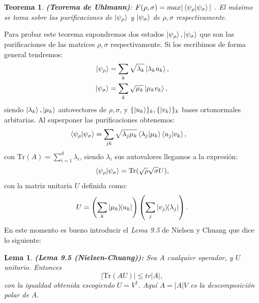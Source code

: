 \documentclass[letterpaper,12pt]{thesisECFM}
\theoremstyle{plain}
\newtheorem{thm}{Teorema}[section]
\newtheorem{lem}{Lema}[chapter]
\theoremstyle{definition}
\theoremstyle{definition}
\theoremstyle{remark}
\newcommand{\1}{\mathbb{1}}
\begin{document}
    \begin{thm}
    \textbf{(Teorema de Uhlmann)}: $F(\rho,\sigma) = max |\braket{\psi_\rho}{\psi_\sigma}|$ . El máximo se toma sobre las purificaciones de $\ket{\psi_\rho}$ y $\ket{\psi_\sigma}$ de $\rho,\sigma$ respectivamente. 
    \end{thm}
     Para probar este teorema supondremos dos estados $\ket{\psi_\rho},\ket{\psi_\sigma}$ que son las purificaciones de las matrices $\rho,\sigma$ respectivamente. Si los escribimos de forma general tendremos:
    \begin{align}
        \ket{\psi_\rho} & = \sum_k \sqrt{\lambda_k} \ket{\lambda_k u_k},\\
        \ket{\psi_\sigma} & = \sum_k \sqrt{\mu_k} \ket{\mu_k v_k},       
    \end{align}
    siendo $\ket{\lambda_k},\ket{\mu_k}$ autovectores de $\rho,\sigma$, y $\{\ket{u_k} \}_k, \{\ket{v_k} \}_k$ bases ortonormales arbitarias. Al superponer las purificaciones obtenemos:
    \begin{align}
        \braket{\psi_\rho}{\psi_\sigma} & = \sum_{jk} \sqrt{\lambda_j\mu_k} \braket{\lambda_j}{\mu_k} \braket{u_j}{v_k},
    \end{align}
    con $\text{Tr}(A) = \sum_{i=1}^{d} \lambda_i$, siendo $\lambda_i$ sus autovalores llegamos a la expresión:
    \begin{equation}
    \label{eq:rho_ij0}
        \braket{\psi_\rho}{\psi_\sigma} = \text{Tr}( \sqrt{\rho}\sqrt{\sigma} U ),
    \end{equation}
    con la matriz unitaria $U$ definida como:
    \begin{equation}
        U = \left(\sum_k \ketbra{\mu_k}{u_k}    \right)  \left(\sum_j \ketbra{v_j} {\lambda_j}   \right) .
    \end{equation} 
    En este momento es bueno introducir el \textit{Lema 9.5} de Nielsen y Chuang \cite{nielsen_chuang_2011} que dice lo siguiente:
    \begin{lem}\textbf{(Lema 9.5 (Nielsen-Chuang)):}  Sea A cualquier operador, y $U$ unitario. Entonces
    \begin{equation}
        | \text{Tr}(AU)| \leq tr|A|,
    \end{equation}
    con la igualdad obtenida escogiendo $U= V^\dagger$. Aquí $A= |A|V$ es la descomposición polar de $A$.
    \end{lem}
\end{document}
